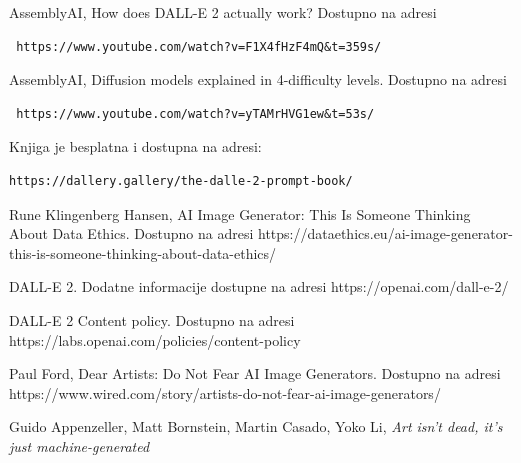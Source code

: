 \documentclass[12pt, letterpaper]{article}
\begin{document}
\begin{thebibliography}{10}
 AssemblyAI, How does DALL-E 2 actually work? Dostupno na adresi\begin{verbatim} https://www.youtube.com/watch?v=F1X4fHzF4mQ&t=359s/

\end{verbatim}

 AssemblyAI, Diffusion models explained in 4-difficulty levels. Dostupno na adresi\begin{verbatim} https://www.youtube.com/watch?v=yTAMrHVG1ew&t=53s/
\end{verbatim}

Knjiga je besplatna i dostupna na adresi:\begin{verbatim}https://dallery.gallery/the-dalle-2-prompt-book/\end{verbatim}

 Rune Klingenberg Hansen, AI Image Generator: This Is Someone Thinking About Data Ethics. Dostupno na adresi https://dataethics.eu/ai-image-generator-this-is-someone-thinking-about-data-ethics/

 DALL-E 2. Dodatne informacije dostupne na adresi https://openai.com/dall-e-2/

 DALL-E 2 Content policy. Dostupno na adresi https://labs.openai.com/policies/content-policy

 Paul Ford, Dear Artists: Do Not Fear AI Image Generators. Dostupno na adresi https://www.wired.com/story/artists-do-not-fear-ai-image-generators/

 Guido Appenzeller, Matt Bornstein, Martin Casado, Yoko Li, \textit{Art isn't dead, it's just machine-generated}

\end{thebibliography}
\end{document}
